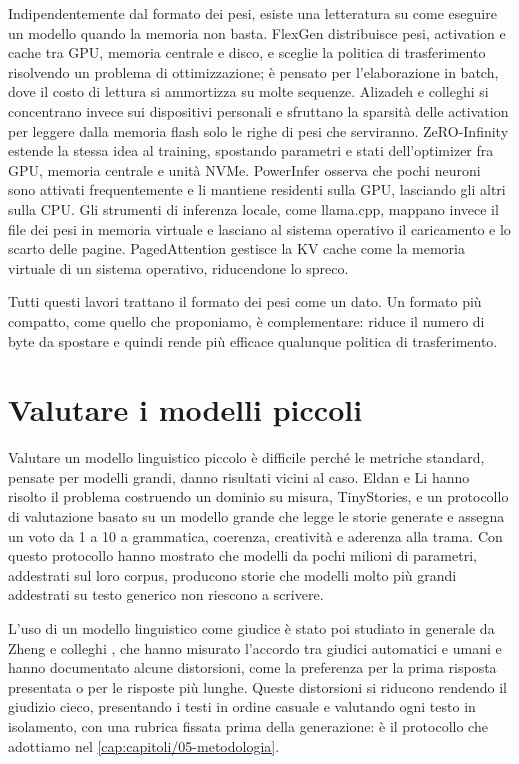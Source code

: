 Indipendentemente dal formato dei pesi, esiste una letteratura su come eseguire un modello quando la memoria non basta. FlexGen \cite{sheng2023flexgen} distribuisce pesi, activation e cache tra GPU, memoria centrale e disco, e sceglie la politica di trasferimento risolvendo un problema di ottimizzazione; è pensato per l'elaborazione in batch, dove il costo di lettura si ammortizza su molte sequenze. Alizadeh e colleghi \cite{alizadeh2024llm} si concentrano invece sui dispositivi personali e sfruttano la sparsità delle activation per leggere dalla memoria flash solo le righe di pesi che serviranno. ZeRO-Infinity \cite{rajbhandari2021zero} estende la stessa idea al training, spostando parametri e stati dell'optimizer fra GPU, memoria centrale e unità NVMe. PowerInfer \cite{song2023powerinfer} osserva che pochi neuroni sono attivati frequentemente e li mantiene residenti sulla GPU, lasciando gli altri sulla CPU. Gli strumenti di inferenza locale, come llama.cpp, mappano invece il file dei pesi in memoria virtuale e lasciano al sistema operativo il caricamento e lo scarto delle pagine. PagedAttention \cite{kwon2023efficient} gestisce la KV cache come la memoria virtuale di un sistema operativo, riducendone lo spreco.

Tutti questi lavori trattano il formato dei pesi come un dato. Un formato più compatto, come quello che proponiamo, è complementare: riduce il numero di byte da spostare e quindi rende più efficace qualunque politica di trasferimento.

\section{Valutare i modelli piccoli}

Valutare un modello linguistico piccolo è difficile perché le metriche standard, pensate per modelli grandi, danno risultati vicini al caso. Eldan e Li \cite{eldan2023tinystories} hanno risolto il problema costruendo un dominio su misura, TinyStories, e un protocollo di valutazione basato su un modello grande che legge le storie generate e assegna un voto da 1 a 10 a grammatica, coerenza, creatività e aderenza alla trama. Con questo protocollo hanno mostrato che modelli da pochi milioni di parametri, addestrati sul loro corpus, producono storie che modelli molto più grandi addestrati su testo generico non riescono a scrivere.

L'uso di un modello linguistico come giudice è stato poi studiato in generale da Zheng e colleghi \cite{zheng2023judging}, che hanno misurato l'accordo tra giudici automatici e umani e hanno documentato alcune distorsioni, come la preferenza per la prima risposta presentata o per le risposte più lunghe. Queste distorsioni si riducono rendendo il giudizio cieco, presentando i testi in ordine casuale e valutando ogni testo in isolamento, con una rubrica fissata prima della generazione: è il protocollo che adottiamo nel \autoref{cap:capitoli/05-metodologia}.

